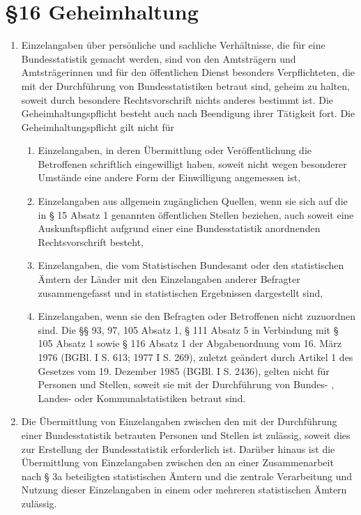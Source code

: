     \section{\S 16 Geheimhaltung}
        \begin{enumerate}[label=(\arabic*)]
            \item Einzelangaben über persönliche und sachliche Verhältnisse, die für eine Bundesstatistik gemacht werden, sind von den Amtsträgern und Amtsträgerinnen und für den öffentlichen Dienst besonders Verpflichteten, die mit der Durchführung von Bundesstatistiken betraut sind, geheim zu halten, soweit durch besondere Rechtsvorschrift nichts anderes bestimmt ist. Die Geheimhaltungspflicht besteht auch nach Beendigung ihrer Tätigkeit fort. Die Geheimhaltungspflicht gilt nicht für
                \begin{enumerate}[label=\arabic*.]
                    \item Einzelangaben, in deren Übermittlung oder Veröffentlichung die Betroffenen schriftlich eingewilligt haben, soweit nicht wegen besonderer Umstände eine andere Form der Einwilligung angemessen ist,
                    \item Einzelangaben aus allgemein zugänglichen Quellen, wenn sie sich auf die in § 15 Absatz 1 genannten öffentlichen Stellen beziehen, auch soweit eine Auskunftspflicht aufgrund einer eine Bundesstatistik anordnenden Rechtsvorschrift besteht,
                    \item Einzelangaben, die vom Statistischen Bundesamt oder den statistischen Äm\-tern der Länder mit den Einzelangaben anderer Befragter zusammengefasst und in statistischen Ergebnissen dargestellt sind, 
                    \item Einzelangaben, wenn sie den Befragten oder Betroffenen nicht zuzuordnen sind. Die §§ 93, 97, 105 Absatz 1, § 111 Absatz 5 in Verbindung mit § 105 Absatz 1 sowie § 116 Absatz 1 der Abgabenordnung vom 16. März 1976 (BGBl. I S. 613; 1977 I S. 269), zuletzt geändert durch Artikel 1 des Gesetzes vom 19. Dezember 1985 (BGBl. I S. 2436), gelten nicht für Personen und Stellen, soweit sie mit der Durchführung von Bundes- , Landes- oder Kommunalstatistiken betraut sind.
                \end{enumerate}
            \item Die Übermittlung von Einzelangaben zwischen den mit der Durchführung einer Bundesstatistik betrauten Personen und Stellen ist zulässig, soweit dies zur Erstellung der Bundesstatistik erforderlich ist. Darüber hinaus ist die Übermittlung von Einzelangaben zwischen den an einer Zusammenarbeit nach § 3a beteiligten statistischen Ämtern und die zentrale Verarbeitung und Nutzung dieser Einzelangaben in einem oder mehreren statistischen Ämtern zulässig.

\end{enumerate}
